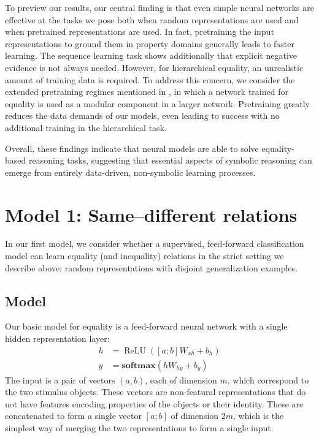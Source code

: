 \documentclass[9pt,twocolumn,twoside,lineno]{pnas-new}
\newcommand{\update}[1]{{\color{darkblue}#1}}
\newcommand{\softmax}{\mathbf{softmax}}
\DeclareMathOperator{\ReLU}{ReLU}
\begin{document}
To preview our results, our central finding is that even simple neural networks are effective at the tasks we pose both when random representations are used and when pretrained representations are used. In fact, \update{ pretraining the input representations to ground them in property domains generally leads to faster learning}.  The sequence learning task shows additionally that explicit negative evidence is not always needed. However, for hierarchical equality, an unrealistic amount of training data is required. To address this concern, we consider the \update{extended pretraining regimes mentioned in \secref{sec:representations}, in which a network trained for equality is used as a modular component in a larger network.} Pretraining greatly reduces the data demands of our models, even leading to success with no additional training in the hierarchical task.

Overall, these findings indicate that neural models are able to solve equality-based reasoning tasks, suggesting that essential aspects of symbolic reasoning can emerge from entirely data-driven, non-symbolic learning processes.


\section{Model 1: Same--different relations}\label{sec:equality}

In our first model, we consider whether a supervised, feed-forward classification model can learn equality (and inequality) relations in the strict setting we describe above: random representations with disjoint generalization examples.


\subsection{Model}

Our basic model for equality is a feed-forward neural network with a single hidden representation layer:
%
\begin{align}
  h &= \ReLU([a;b]W_{xh} + b_{h}) \label{eq:x2h}\\
  y &= \softmax(hW_{hy} + b_{y}) \label{eq:h2y}
\end{align}
%
The input is a pair of vectors $(a, b)$, each of dimension $m$, which correspond to the two stimulus objects. These vectors are non-featural representations that do not have features encoding properties of the objects or their identity. These are concatenated to form a single vector $[a;b]$ of dimension $2m$, which is the simplest way of merging the two representations to form a single input.
\end{document}
